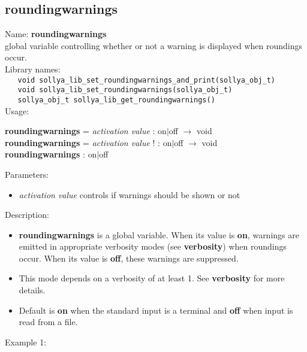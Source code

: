 \subsection{roundingwarnings}
\label{labroundingwarnings}
\noindent Name: \textbf{roundingwarnings}\\
\phantom{aaa}global variable controlling whether or not a warning is displayed when roundings occur.\\[0.2cm]
\noindent Library names:\\
\verb|   void sollya_lib_set_roundingwarnings_and_print(sollya_obj_t)|\\
\verb|   void sollya_lib_set_roundingwarnings(sollya_obj_t)|\\
\verb|   sollya_obj_t sollya_lib_get_roundingwarnings()|\\[0.2cm]
\noindent Usage: 
\begin{center}
\textbf{roundingwarnings} = \emph{activation value} : \textsf{on$|$off} $\rightarrow$ \textsf{void}\\
\textbf{roundingwarnings} = \emph{activation value} ! : \textsf{on$|$off} $\rightarrow$ \textsf{void}\\
\textbf{roundingwarnings} : \textsf{on$|$off}\\
\end{center}
Parameters: 
\begin{itemize}
\item \emph{activation value} controls if warnings should be shown or not
\end{itemize}
\noindent Description: \begin{itemize}

\item \textbf{roundingwarnings} is a global variable. When its value is \textbf{on}, warnings are
   emitted in appropriate verbosity modes (see \textbf{verbosity}) when roundings
   occur.  When its value is \textbf{off}, these warnings are suppressed.

\item This mode depends on a verbosity of at least 1. See
   \textbf{verbosity} for more details.

\item Default is \textbf{on} when the standard input is a terminal and
   \textbf{off} when \sollya input is read from a file.
\end{itemize}
\noindent Example 1: 
